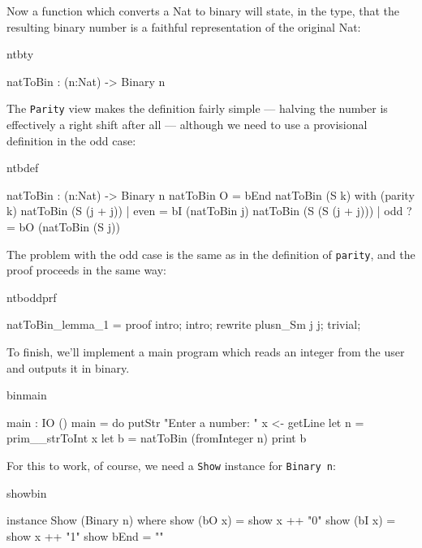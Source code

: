 Now a function which converts a Nat to binary will state, in the type, that the
resulting binary number is a faithful representation of the original Nat:

\begin{SaveVerbatim}{ntbty}

natToBin : (n:Nat) -> Binary n

\end{SaveVerbatim}

\noindent
The \texttt{Parity} view makes the definition fairly simple --- halving the
number is effectively a right shift after all --- although we need to use a
provisional definition in the odd case:

\begin{SaveVerbatim}{ntbdef}

natToBin : (n:Nat) -> Binary n
natToBin O = bEnd
natToBin (S k) with (parity k)
   natToBin (S (j + j))     | even  = bI (natToBin j)
   natToBin (S (S (j + j))) | odd  ?= bO (natToBin (S j))

\end{SaveVerbatim}

\noindent
The problem with the odd case is the same as in the definition of \texttt{parity}, and
the proof proceeds in the same way:

\begin{SaveVerbatim}{ntboddprf}

natToBin_lemma_1 = proof {
    intro;
    intro;
    rewrite plusn_Sm j j;
    trivial;
}

\end{SaveVerbatim}

\noindent
To finish, we'll implement a main program which reads an integer from the user and
outputs it in binary. 

\begin{SaveVerbatim}{binmain}

main : IO ()
main = do putStr "Enter a number: "
          x <- getLine
          let n = prim__strToInt x
          let b = natToBin (fromInteger n)
          print b 

\end{SaveVerbatim}

\noindent
For this to work, of course, we need a \texttt{Show} instance for \texttt{Binary n}:

\begin{SaveVerbatim}{showbin}

instance Show (Binary n) where
    show (bO x) = show x ++ "0"
    show (bI x) = show x ++ "1"
    show bEnd = ""

\end{SaveVerbatim}

